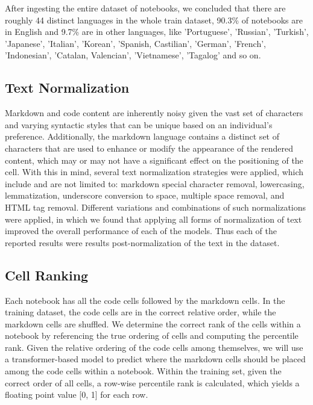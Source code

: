 \documentclass[conference]{IEEEtran}
\begin{document}
After ingesting the entire dataset of notebooks, we concluded that there are roughly 44 distinct languages in the whole train dataset, 90.3\% of notebooks are in English and 9.7\% are in other languages, like 'Portuguese', 'Russian', 'Turkish', 'Japanese', 'Italian', 'Korean', 'Spanish, Castilian', 'German', 'French', 'Indonesian', 'Catalan, Valencian', 'Vietnamese', 'Tagalog’ and so on.


\subsection{Text Normalization}
Markdown and code content are inherently noisy given the vast set of characters and varying syntactic styles that can be unique based on an individual’s preference. Additionally, the markdown language contains a distinct set of characters that are used to enhance or modify the appearance of the rendered content, which may or may not have a significant effect on the positioning of the cell.  With this in mind, several text normalization strategies were applied, which include and are not limited to: markdown special character removal, lowercasing, lemmatization, underscore conversion to space, multiple space removal, and HTML tag removal. Different variations and combinations of such normalizations were applied, in which we found that applying all forms of normalization of text improved the overall performance of each of the models. Thus each of the reported results were results post-normalization of the text in the dataset.

\subsection{Cell Ranking}
Each notebook has all the code cells followed by the markdown cells. In the training dataset, the code cells are in the correct relative order, while the markdown cells are shuffled. We determine the correct rank of the cells within a notebook by referencing the true ordering of cells and computing the percentile rank. Given the relative ordering of the code cells among themselves, we will use a transformer-based model to predict where the markdown cells should be placed among the code cells within a notebook. Within the training set, given the correct order of all cells, a row-wise percentile rank is calculated, which yields a floating point value [0, 1] for each row.
\end{document}
